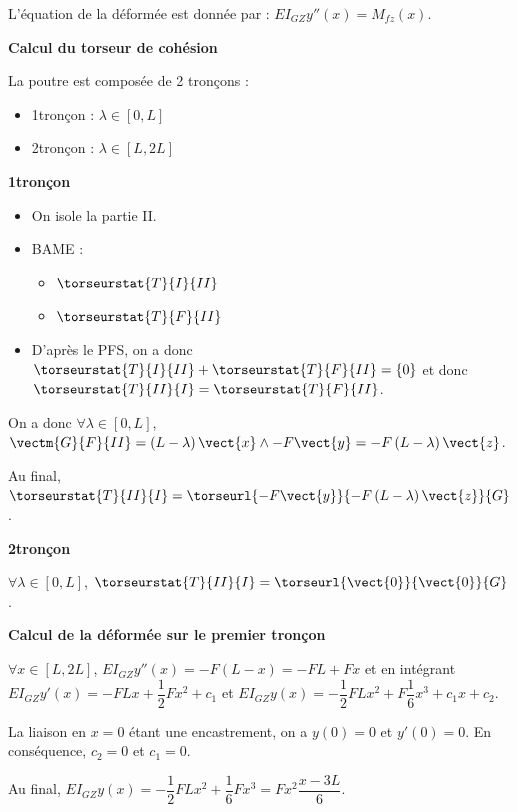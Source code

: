 \begin{corrigebox}
L'équation de la déformée est donnée par : $EI_{GZ}y''(x)=M_{fz}(x)$.

\textbf{Calcul du torseur de cohésion}

La poutre est composée de 2 tronçons :
\begin{itemize}
\item 1\ier tronçon : $\lambda\in[0,L]$
\item 2\ieme tronçon : $\lambda\in[L,2L]$
\end{itemize}

\textbf{1\ier tronçon}
\begin{itemize}
\item On isole la partie II.
\item BAME : 
\begin{itemize}
\item $\torseurstat{T}{I}{II}$
\item $\torseurstat{T}{F}{II}$
\end{itemize}
\item D'après le PFS, on a donc $\torseurstat{T}{I}{II} + \torseurstat{T}{F}{II} = \{0\}$ et donc 
$\torseurstat{T}{II}{I} =  \torseurstat{T}{F}{II}$.
\end{itemize}
On a donc $\forall \lambda\in[0,L]$, $\vectm{G}{F}{II}=  \left(L-\lambda\right)\vect{x} \wedge - F\vect{y} =-F\left(L-\lambda\right) \vect{z} $. 

Au final, $\torseurstat{T}{II}{I} = \torseurl{-F\vect{y}}{-F\left(L-\lambda\right) \vect{z}}{G}$.

\textbf{2\ieme tronçon}

$\forall \lambda \in [0,L]$, $\torseurstat{T}{II}{I} = \torseurl{\vect{0}}{\vect{0}}{G}$.

\textbf{Calcul de la déformée sur le premier tronçon}

 $\forall x \in [L,2L]$, $EI_{GZ}y''(x)=-F\left(L-x\right) =-FL + Fx $ 
et en intégrant $EI_{GZ}y'(x)= -FLx +\dfrac{1}{2}Fx^2+ c_1$ et  $EI_{GZ}y(x)= -\dfrac{1}{2}FLx^2 +F \dfrac{1}{6}x^3+ c_1x + c_2$.

La liaison en $x=0$ étant une encastrement, on a $y(0)=0$ et $y'(0)=0$. 
En conséquence, $c_2=0 $ et $c_1=0$.

Au final, $EI_{GZ}y(x)= -\dfrac{1}{2}FLx^2 + \dfrac{1}{6}Fx^3 = Fx^2\dfrac{x - 3L}{6}$.


\end{corrigebox}
